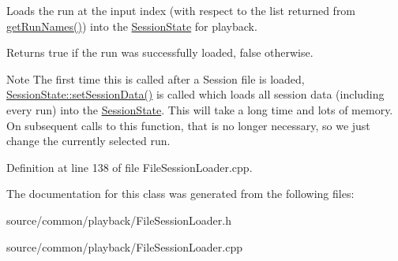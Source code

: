 Loads the run at the input index (with respect to the list returned from \hyperlink{class_picto_1_1_file_session_loader_a594062ade9010399ea05e273387ef9d9}{get\-Run\-Names()}) into the \hyperlink{class_picto_1_1_session_state}{Session\-State} for playback. 

Returns true if the run was successfully loaded, false otherwise. \begin{DoxyNote}{Note}
The first time this is called after a Session file is loaded, \hyperlink{class_picto_1_1_session_state_a54ef9957c7c3f166de6bcc76f61b65f9}{Session\-State\-::set\-Session\-Data()} is called which loads all session data (including every run) into the \hyperlink{class_picto_1_1_session_state}{Session\-State}. This will take a long time and lots of memory. On subsequent calls to this function, that is no longer necessary, so we just change the currently selected run. 
\end{DoxyNote}


Definition at line 138 of file File\-Session\-Loader.\-cpp.



The documentation for this class was generated from the following files\-:\begin{DoxyCompactItemize}
\item 
source/common/playback/File\-Session\-Loader.\-h\item 
source/common/playback/File\-Session\-Loader.\-cpp\end{DoxyCompactItemize}
